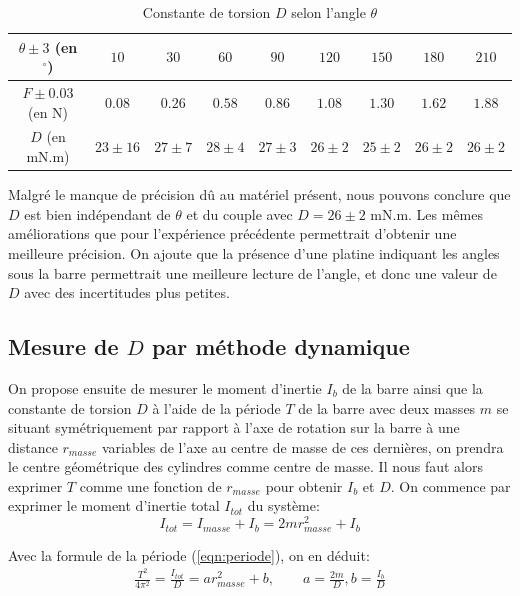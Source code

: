 \documentclass[12pt]{article}
\begin{document}
\break

\begin{table}[h!]
	\centering
	\begin{tabular}{||c | c c c c c c c c||} 
		\hline
		$\theta \pm 3$ (en $^\circ$) & $10$ & $30$ & $60$ & $90$ & $120$ & $150$ & $180$ & $210$ \\
		\hline
        $F \pm 0.03$ (en N) & $0.08$ & $0.26$ & $0.58$ & $0.86$ & $1.08$ & $1.30$ & $1.62$ & $1.88$\\
		\hline
        $D$ (en mN.m) & $23 \pm 16$ & $27 \pm 7$ & $28 \pm 4$ & $27 \pm 3$ & $26 \pm 2$ & $25 \pm 2$ & $26 \pm 2$ & $26 \pm 2$\\
        \hline
    \end{tabular}
	\caption{Constante de torsion $D$ selon l'angle $\theta$}
	\label{table:mesure_D_statique}
\end{table}

Malgré le manque de précision dû au matériel présent, nous pouvons conclure que $D$ est bien indépendant de $\theta$ et du couple avec $D=26 \pm 2 \text{ mN.m}$. 
Les mêmes améliorations que pour l'expérience précédente permettrait d'obtenir une meilleure précision. 
On ajoute que la présence d'une platine indiquant les angles sous la barre permettrait une meilleure
lecture de l'angle, et donc une valeur de $D$ avec des incertitudes plus petites.


\subsection{Mesure de $D$ par méthode dynamique}
On propose ensuite de mesurer le moment d'inertie $I_b$ de la barre ainsi que la constante de torsion $D$ à l'aide de la période $T$
de la barre avec deux masses $m$ se situant symétriquement par rapport à l'axe de rotation sur la barre à une distance $r_{masse}$ variables de l'axe au centre de masse de ces dernières, on prendra le centre géométrique des cylindres
comme centre de masse. Il nous faut alors exprimer $T$ comme une fonction de $r_{masse}$ pour obtenir 
$I_b$ et $D$. On commence par exprimer le moment d'inertie total $I_{tot}$ du système:
\begin{equation}
    I_{tot} = I_{masse} + I_b = 2mr_{masse}^2 + I_b
\end{equation}

Avec la formule de la période (\ref{eqn:periode}), on en déduit:
\begin{align*}
    \frac{T^2}{4\pi^2} = \frac{I_{tot}}{D} = ar_{masse}^2 + b, \quad \quad a = \frac{2m}{D}, b=\frac{I_b}{D}
\end{align*}
\end{document}
